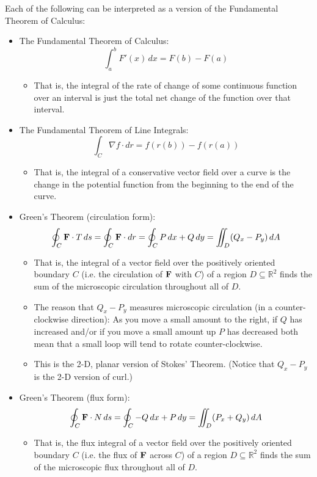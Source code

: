 Each of the following can be interpreted as a version of the Fundamental Theorem of Calculus:
\begin{itemize}
    \item The Fundamental Theorem of Calculus:
    \[
        \int_a^b F'(x) \, dx = F(b) - F(a)
    \]
    \begin{itemize}
        \item That is, the integral of the rate of change of some continuous function over an interval is just the total net change of the function over that interval.
    \end{itemize}
    \item The Fundamental Theorem of Line Integrals:
    \[
        \int_C \nabla f \cdot dr = f(r(b)) - f(r(a))
    \]
    \begin{itemize}
        \item That is, the integral of a conservative vector field over a curve is the change in the potential function from the beginning to the end of the curve.
    \end{itemize}
    \item Green’s Theorem (circulation form): 
    \[
        \oint_C \mathbf{F} \cdot T \, ds = \oint_C \mathbf{F} \cdot dr = \oint_C P \, dx + Q \, dy = \iint_D (Q_x - P_y) \, dA
    \]
    \begin{itemize}
        \item That is, the integral of a vector field over the positively oriented boundary \(C\) (i.e. the circulation of \(\mathbf{F}\) with \(C\)) of a region \(D \subseteq \mathbb{R}^2\) finds the sum of the microscopic circulation throughout all of \(D\).
        \item The reason that \(Q_x - P_y\) measures microscopic circulation (in a counter-clockwise direction): As you move a small amount to the right, if \(Q\) has increased and/or if you move a small amount up \(P\) has decreased both mean that a small loop will tend to rotate counter-clockwise.
        \item This is the 2-D, planar version of Stokes’ Theorem. (Notice that \(Q_x - P_y\) is the 2-D version of curl.)
    \end{itemize}
    \item Green’s Theorem (flux form):
    \[
        \oint_C \mathbf{F} \cdot N \, ds = \oint_C -Q \, dx + P \, dy = \iint_D (P_x + Q_y) \, dA
    \]
    \begin{itemize}
        \item That is, the flux integral of a vector field over the positively oriented boundary \(C\) (i.e. the flux of \(\mathbf{F}\) across \(C\)) of a region \(D \subseteq \mathbb{R}^2\) finds the sum of the microscopic flux throughout all of \(D\).

\end{itemize}
\end{itemize}
